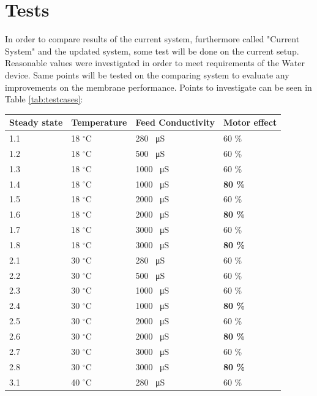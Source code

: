 \section{Tests}
In order to compare results of the current system, furthermore called "Current System" and the updated system, some test will be done on the current setup. Reasonable values were investigated in order to meet requirements of the Water device. Same points will be tested on the comparing system to evaluate any improvements on the membrane performance. Points to investigate can be seen in Table \ref{tab:testcases}:\\
\begin{table}[h]
\begin{tabular}{|p{1.4cm}||p{2cm}|p{3.2cm}|p{1.8cm}|}
 \hline
 \textbf{Steady state }&Temperature&Feed Conductivity&Motor effect \\
 \hline
 1.1 & 18 $^\circ$C   & 280 \SI{}{\micro\siemens} & 60 \% \\
 1.2   &  18 $^\circ$C   & 500 \SI{}{\micro\siemens} & 60 \% \\
 1.3 &  18 $^\circ$C  &1000 \SI{}{\micro\siemens} & 60 \% \\
 1.4 &  18 $^\circ$C  &1000 \SI{}{\micro\siemens} & \textbf{80 \%} \\
 1.5 &18 $^\circ$C &2000 \SI{}{\micro\siemens}& 60 \%\\
 1.6 &18 $^\circ$C  &2000 \SI{}{\micro\siemens}& \textbf{80 \%}\\
 1.7   &18 $^\circ$C & 3000 \SI{}{\micro\siemens}&60 \% \\
 1.8   &18 $^\circ$C&3000 \SI{}{\micro\siemens}& \textbf{80 \%}\\
 \hline
 2.1 & 30 $^\circ$C & 280 \SI{}{\micro\siemens}&60 \%\\
 2.2 & 30 $^\circ$C &500 \SI{}{\micro\siemens}& 60 \%\\
 2.3 & 30 $^\circ$C&1000 \SI{}{\micro\siemens}& 60 \%\\
 2.4 & 30 $^\circ$C&1000 \SI{}{\micro\siemens}& \textbf{80 \%}\\
 2.5 & 30 $^\circ$C&2000 \SI{}{\micro\siemens}& 60 \%\\
 2.6 & 30 $^\circ$C&2000 \SI{}{\micro\siemens}& \textbf{80 \%}\\
 2.7 & 30 $^\circ$C& 3000 \SI{}{\micro\siemens}&60 \%\\
 2.8 & 30 $^\circ$C& 3000 \SI{}{\micro\siemens}&\textbf{80 \%}\\
 \hline 
 3.1 & 40 $^\circ$C& 280 \SI{}{\micro\siemens}& 60 \%\\

\end{tabular}
\end{table}
